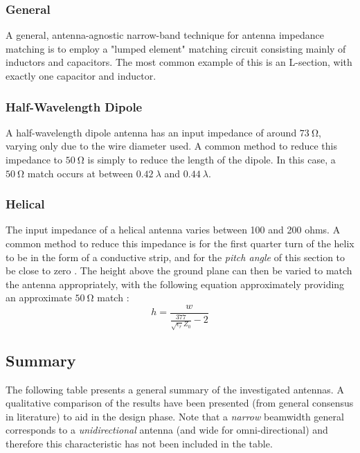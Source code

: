 \subsubsection{General}
A general, antenna-agnostic narrow-band technique for antenna impedance matching is to employ a "lumped element" matching circuit consisting mainly of inductors and capacitors. The most common example of this is an L-section, with exactly one capacitor and inductor.

\subsubsection{Half-Wavelength Dipole}
A half-wavelength dipole antenna has an input impedance of around $\SI{73}{\ohm}$, varying only due to the wire diameter used. A common method to reduce this impedance to $\SI{50}{\ohm}$ is simply to reduce the length of the dipole. In this case, a $\SI{50}{\ohm}$ match occurs at between $\SI{0.42}{\lambda}$ and $\SI{0.44}{\lambda}$. \cite{textbook-antennaTheoryAnalysisDesign}

\subsubsection{Helical}\label{sec:helical_matching}
The input impedance of a helical antenna varies between 100 and 200 ohms. A common method to reduce this impedance is for the first quarter turn of the helix to be in the form of a conductive strip, and for the \textit{pitch angle} of this section to be close to zero \cite{textbook-antennaTheoryAnalysisDesign}. The height above the ground plane can then be varied to match the antenna appropriately, with the following equation approximately providing an approximate $\SI{50}{\ohm}$ match \cite{textbook-antennaTheoryAnalysisDesign}:
$$h = \frac{w}{\frac{377}{\sqrt{\epsilon_r} Z_0} - 2}$$

\subsection{Summary}
The following table presents a general summary of the investigated antennas. A qualitative comparison of the results have been presented (from general consensus in literature) to aid in the design phase. Note that a \textit{narrow} beamwidth general corresponds to a \textit{unidirectional} antenna (and wide for omni-directional) and therefore this characteristic has not been included in the table.

